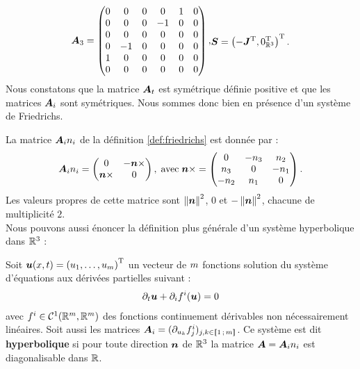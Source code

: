 \begin{subequations}
	\begin{align}
		\Ac{3} =
		\begin{pmatrix}
			0 & 0 & 0 & 0 & 1 & 0 \\
			0 & 0 & 0 & -1 & 0 & 0 \\
			0 & 0 & 0 & 0 & 0 & 0 \\
			0 & -1 & 0 & 0 & 0 & 0 \\
			1 & 0 & 0 & 0 & 0 & 0 \\
			0 & 0 & 0 & 0 & 0 & 0
		\end{pmatrix}
		\label{eq:matrice_a3} ,
	\end{align}
	\begin{align}
		\Src = \Trp{\left(-\Trp{\J},\Trp{0_{\Esp}}\right)}
		\label{eq:source} .
	\end{align}
\end{subequations}
Nous constatons que la matrice $\bm{A}_{t}$ est symétrique définie positive et que les matrices
$\bm{A}_{i}$ sont symétriques. Nous sommes donc bien en présence d'un système de Friedrichs.

La matrice ${\bm{A}_{i}n_{i}}$ de la définition \ref{def:friedrichs} est donnée par :
\begin{align}
	{\bm{A}_{i}n_{i}} = 
	\begin{pmatrix}
		0 & -\bm{n} \times \\
		\bm{n} \times & 0
	\end{pmatrix} ,
	\; \mathrm{avec} \;
	\bm{n} \times =
	\begin{pmatrix}
		0 & -n_{3} & n_{2} \\
		n_{3} & 0 & -n_{1} \\
		-n_{2} & n_{1} & 0
	\end{pmatrix} .
\end{align}
Les valeurs propres de cette matrice sont $\left\Vert\bm{n}\right\Vert^2$, $0$ et
$-\left\Vert\bm{n}\right\Vert^2$, chacune de multiplicité $2$.
\\

Nous pouvons aussi énoncer la définition plus générale d'un système hyperbolique
dans $\mathbb{R}^{3}$ :
\begin{definition}
	Soit $\bm{u}(x,t) =
	\left(u_1,\dots,u_m\right)^{\mathrm{T}}$ un vecteur
	de $m$ fonctions solution du système d'équations aux dérivées
	partielles suivant :
	\begin{align}
		\partial_{t} \bm{u} + \partial_{i} f^i(\bm{u}) = 0
		\label{eq:systeme_hyperbolique}
	\end{align}
	avec $f^i \in \mathcal{C}^1(\mathbb{R}^m,\mathbb{R}^m)$ des fonctions
	continuement dérivables non nécessairement linéaires. Soit aussi les matrices
	$\bm{A}_{i} = (\partial_{u_k} f^i_j)_{j,k \in \lbrack\!\lbrack1\,;\,m\rbrack\!\rbrack}$.
	Ce système est dit \textbf{hyperbolique} si pour toute direction
	$\bm{n}$ de $\mathbb{R}^{3}$ la matrice $\bm{A} = {\bm{A}_{i}n_{i}}$ est diagonalisable dans $\mathbb{R}$.
\end{definition}


